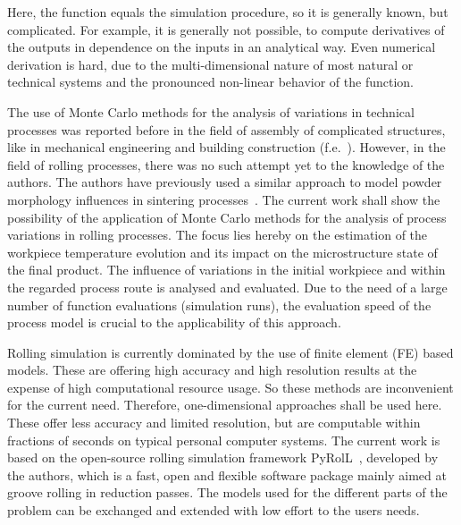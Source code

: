 Here, the function equals the simulation procedure, so it is generally known, but complicated.
For example, it is generally not possible, to compute derivatives of the outputs in dependence on the inputs in an analytical way.
Even numerical derivation is hard, due to the multi-dimensional nature of most natural or technical systems and the pronounced non-linear behavior of the function.

The use of Monte Carlo methods for the analysis of variations in technical processes was reported before in the field of assembly of complicated structures, like in mechanical engineering and building construction (f.e.~\cite{Lin1997, Shen2005, Dantan2009, Qureshi2012, Yan2015, Rausch2019}).
However, in the field of rolling processes, there was no such attempt yet to the knowledge of the authors.
The authors have previously used a similar approach to model powder morphology influences in sintering processes~\cite{Weiner2022, Weiner2022b}.
The current work shall show the possibility of the application of Monte Carlo methods for the analysis of process variations in rolling processes.
The focus lies hereby on the estimation of the workpiece temperature evolution and its impact on the microstructure state of the final product.
The influence of variations in the initial workpiece and within the regarded process route is analysed and evaluated.
Due to the need of a large number of function evaluations (simulation runs), the evaluation speed of the process model is crucial to the applicability of this approach.

Rolling simulation is currently dominated by the use of finite element (FE) based models.
These are offering high accuracy and high resolution results at the expense of high computational resource usage.
So these methods are inconvenient for the current need.
Therefore, one-dimensional approaches shall be used here.
These offer less accuracy and limited resolution, but are computable within fractions of seconds on typical personal computer systems.
The current work is based on the open-source rolling simulation framework PyRolL~\cite{pyroll2}, developed by the authors, which is a fast, open and flexible software package mainly aimed at groove rolling in reduction passes.
The models used for the different parts of the problem can be exchanged and extended with low effort to the users needs.

